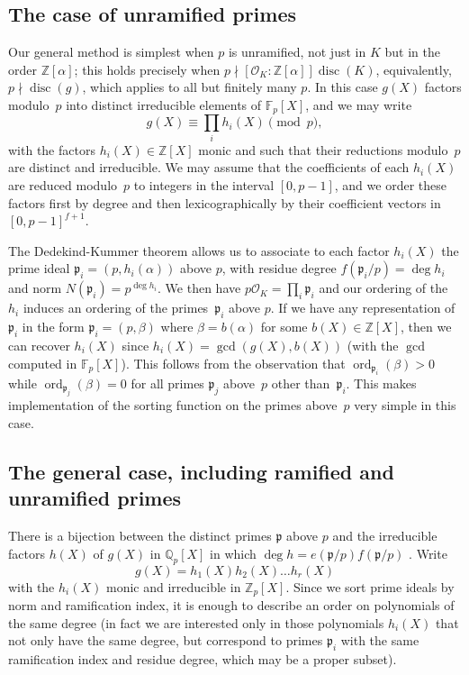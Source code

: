 \documentclass{article}
\def\Z{{\mathbb Z}}
\def\Q{{\mathbb Q}}
\def\F{{\mathbb F}}
\def\Fp{{\mathbb F}_p}
\def\OO{{\mathcal O}}
\def\p{{\mathfrak p}}
\DeclareMathOperator{\disc}{disc}
\DeclareMathOperator{\ord}{ord}
\begin{document}
\subsection{The case of unramified primes}

Our general method is simplest when $p$ is unramified, not just in $K$
but in the order $\Z[\alpha]$; this holds precisely when $p\nmid [\OO_K:\Z[\alpha]]\disc(K)$, equivalently, $p\nmid\disc(g)$, which applies to all but finitely many $p$.  In this case $g(X)$ factors modulo~$p$ into distinct irreducible elements of $\Fp[X]$, and we may
write
\[
    g(X) \equiv \prod_i h_i(X) \pmod{p},
\]
with the factors $h_i(X)\in\Z[X]$ monic and such that their reductions
modulo~$p$ are distinct and irreducible.  We may assume that the
coefficients of each $h_i(X)$ are reduced modulo~$p$ to integers in the interval $[0,p-1]$, and we order these factors first by degree and then lexicographically by their coefficient vectors in $[0,p-1]^{f+1}$.

The Dedekind-Kummer theorem allows us to associate to each factor
$h_i(X)$ the prime ideal $\p_i=(p,h_i(\alpha))$ above $p$, with
residue degree $f(\p_i/p)=\deg h_i$ and norm $N(\p_i)=p^{\deg h_i}$.
We then have $p\OO_K=\prod_i \p_i$ and our ordering of the $h_i$
induces an ordering of the primes~$\p_i$ above $p$.  If we have any
representation of $\p_i$ in the form $\p_i=(p,\beta)$ where
$\beta=b(\alpha)$ for some $b(X)\in\Z[X]$, then we can recover
$h_i(X)$ since $h_i(X)=\gcd(g(X),b(X))$ (with the $\gcd$ computed in
$\F_p[X]$).  This follows from the observation that
$\ord_{\p_i}(\beta)>0$ while $\ord_{\p_j}(\beta)=0$ for all primes
$\p_j$ above~$p$ other than~$\p_i$.  This makes implementation of the
sorting function on the primes above~$p$ very simple in this case.

\subsection{The general case, including ramified and unramified primes}

There is a bijection between the distinct primes $\p$ above $p$ and
the irreducible factors $h(X)$ of $g(X)$ in $\Q_p[X]$ in which $\deg h
= e(\p/p)f(\p/p)$ \cite[Theorem 3.8 (d)]{Janusz}.  Write
\[
  g(X) = h_1(X)h_2(X)\dots h_r(X)
\]
with the $h_i(X)$ monic and irreducible in $\Z_p[X]$. Since we sort prime ideals
by norm and ramification index, it is enough to describe an order on polynomials
of the same degree (in fact we are interested only in those polynomials $h_i(X)$
that not only have the same degree, but correspond to primes $\p_i$ with the same
ramification index and residue degree, which may be a proper subset).
\end{document}
